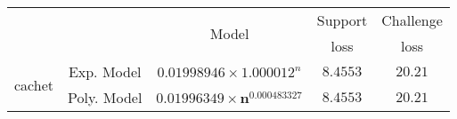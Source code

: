 \begin{tabular}{ccccc} 
\hline 
 &  & \multirow{2}{*}{Model} & Support & Challenge\tabularnewline 
 &  &  & loss  & loss\tabularnewline 
\hline 
\hline 
\multirow{2}{*}{cachet} & Exp. Model & $0.01998946\times 1.000012^{n}$ & $8.4553$ & $20.21$ \tabularnewline 
 & Poly. Model & $\mathbf{0.01996349\times n^{0.000483327}}$ & $\mathbf{8.4553}$ & $\mathbf{20.21}$ \tabularnewline 
\hline 
\end{tabular} 

